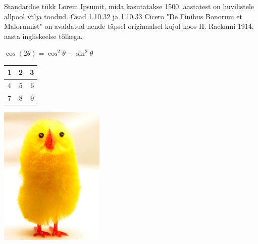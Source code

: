 \documentclass{21kuur}
\begin{document}
Standardne tükk Lorem Ipsumit, mida kasutatakse 1500. aastatest on huvilistele allpool välja toodud. Osad 1.10.32 ja 1.10.33 Cicero "De Finibus Bonorum et Malorumist" on avaldatud nende täpsel originaalsel kujul koos H. Rackami 1914. aasta ingliskeelse tõlkega.

$\cos (2\theta) = \cos^2 \theta - \sin^2 \theta$

\begin{center}
  \begin{tabular}{| l | c | r |}
    \hline
    1 & 2 & 3 \\ \hline
    4 & 5 & 6 \\ \hline
    7 & 8 & 9 \\
    \hline
  \end{tabular}
\end{center}

\includegraphics[scale=0.5]{Chick1}
\end{document}
